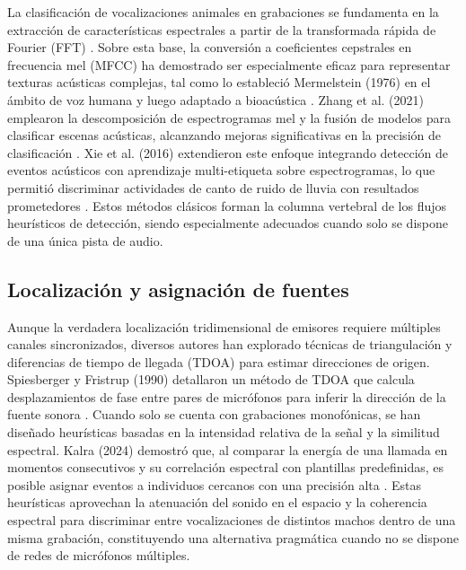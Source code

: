 La clasificación de vocalizaciones animales en grabaciones 
se fundamenta en la extracción de características 
espectrales a partir de la transformada rápida de Fourier 
(FFT) \cite{cooley1965algorithm}. Sobre esta base, la conversión a 
coeficientes cepstrales en frecuencia mel (MFCC) ha 
demostrado ser especialmente eficaz para representar texturas 
acústicas complejas, tal como lo estableció Mermelstein 
(1976) en el ámbito de voz humana y luego adaptado a 
bioacústica \cite{mermelstein1976distance}. Zhang et al. (2021) 
emplearon la descomposición de espectrogramas mel y la fusión de 
modelos para clasificar escenas acústicas, alcanzando mejoras 
significativas en la precisión de clasificación 
\cite{zhang2021acoustic}. Xie et al. (2016) extendieron este 
enfoque integrando detección de eventos acústicos con 
aprendizaje multi-etiqueta sobre espectrogramas, lo que 
permitió discriminar actividades de canto de ruido de lluvia 
con resultados prometedores \cite{xie2016detecting}. 
Estos métodos clásicos forman la columna vertebral de los 
flujos heurísticos de detección, siendo especialmente 
adecuados cuando solo se dispone de una única pista de audio.

\subsection{Localización y asignación de fuentes}
Aunque la verdadera localización tridimensional de emisores 
requiere múltiples canales sincronizados, diversos autores 
han explorado técnicas de triangulación y diferencias de 
tiempo de llegada (TDOA) para estimar direcciones de origen. 
Spiesberger y Fristrup (1990) detallaron un método de TDOA 
que calcula desplazamientos de fase entre pares de micrófonos 
para inferir la dirección de la fuente sonora 
\cite{spiesberger1990passive}. Cuando solo se cuenta 
con grabaciones monofónicas, se han diseñado heurísticas 
basadas en la intensidad relativa de la señal y la similitud 
espectral. Kalra (2024) demostró que, al comparar la energía 
de una llamada en momentos consecutivos y su correlación 
espectral con plantillas predefinidas, es posible asignar 
eventos a individuos cercanos con una precisión alta
\cite{kalra2024signal}. Estas heurísticas aprovechan la atenuación 
del sonido en el espacio y la coherencia espectral para 
discriminar entre vocalizaciones de distintos machos dentro 
de una misma grabación, constituyendo una alternativa 
pragmática cuando no se dispone de redes de micrófonos 
múltiples.



